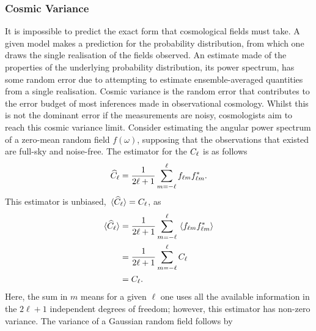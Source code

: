 \subsubsection{Cosmic Variance}

It is impossible to predict the exact form that cosmological fields must take.
A given model makes a prediction for the probability distribution, from which one draws the single realisation of the fields observed.
An estimate made of the properties of the underlying probability distribution, \ie{} its power spectrum, has some random error due to attempting to estimate ensemble-averaged quantities from a single realisation.
Cosmic variance is the random error that contributes to the error budget of most inferences made in observational cosmology.
Whilst this is not the dominant error if the measurements are noisy, cosmologists aim to reach this cosmic variance limit.
Consider estimating the angular power spectrum of a zero-mean random field \(f(\omega)\), supposing that the observations that existed are full-sky and noise-free.
The estimator for the \(C_{\ell}{}\) is as follows
%
\begin{equation}
    \widehat{C}_{\ell}
    = \frac{1}{2\ell+1} \sum\limits_{m=-\ell}^{\ell} {f}_{\ell m} {f}_{\ell m}^{\ast}.
\end{equation}
%
This estimator is unbiased, \ie{} \(\expval*{\widehat{C}_{\ell}} = C_{\ell}{}\), as
%
\begin{align}
    \expval*{\widehat{C}_{\ell}}
     & = \frac{1}{2\ell+1} \sum\limits_{m=-\ell}^{\ell} \expval*{{f}_{\ell m} {f}_{\ell m}^{\ast}} \nonumber{} \\
     & = \frac{1}{2\ell+1} \sum\limits_{m=-\ell}^{\ell} C_{\ell} \nonumber{}                             \\
     & = C_{\ell}.
\end{align}
%
Here, the sum in \(m\) means for a given \(\ell{}\) one uses all the available information in the \(2\ell+1\) independent degrees of freedom; however, this estimator has non-zero variance.
The variance of a Gaussian random field follows by
%
